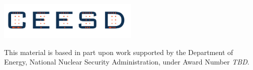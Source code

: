 \documentclass{beamer}
\begin{document}
\begin{frame}\frametitle{}

\vspace*{0.2in}

\begin{center}

\includegraphics[width=0.5\textwidth]{Figures/ceesd-logo-2.pdf}

\vspace*{0.35in}

\vspace*{0.5in}
\begin{minipage}{0.8\textwidth}
This material is based in part upon work supported by the Department of Energy, National Nuclear Security Administration, under Award Number \textit{TBD}. 
\end{minipage}

\end{center}


\end{frame}

 
\end{document}
